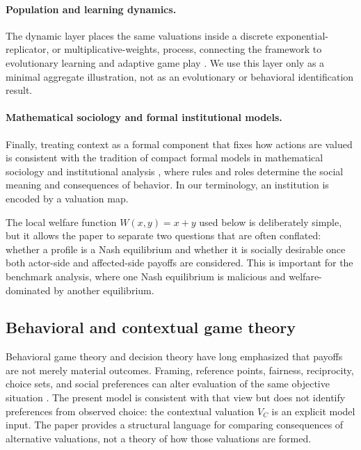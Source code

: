 \documentclass[a4paper,fleqn]{cas-dc}
\theoremstyle{remark}
\begin{document}
\paragraph{Population and learning dynamics.} The dynamic layer places the same valuations inside a discrete exponential-replicator, or multiplicative-weights, process, connecting the framework to evolutionary learning and adaptive game play \citep{Weibull1995,HofbauerSigmund1998,FreundSchapire1999,Sandholm2010}. We use this layer only as a minimal aggregate illustration, not as an evolutionary or behavioral identification result.

\paragraph{Mathematical sociology and formal institutional models.} Finally, treating context as a formal component that fixes how actions are valued is consistent with the tradition of compact formal models in mathematical sociology and institutional analysis \citep{Gintis2009,Coleman1990,North1990,Ostrom2005}, where rules and roles determine the social meaning and consequences of behavior. In our terminology, an institution is encoded by a valuation map.

The local welfare function $W(x,y)=x+y$ used below is deliberately simple, but it allows the paper to separate two questions that are often conflated: whether a profile is a Nash equilibrium and whether it is socially desirable once both actor-side and affected-side payoffs are considered. This is important for the benchmark analysis, where one Nash equilibrium is malicious and welfare-dominated by another equilibrium.

\subsection{Behavioral and contextual game theory}

Behavioral game theory and decision theory have long emphasized that payoffs are not merely material outcomes. Framing, reference points, fairness, reciprocity, choice sets, and social preferences can alter evaluation of the same objective situation \citep{KahnemanTversky1979,TverskyKahneman1981,TverskySimonson1993,Rabin1993,FehrSchmidt1999}. The present model is consistent with that view but does not identify preferences from observed choice: the contextual valuation $V_C$ is an explicit model input. The paper provides a structural language for comparing consequences of alternative valuations, not a theory of how those valuations are formed.
\end{document}

